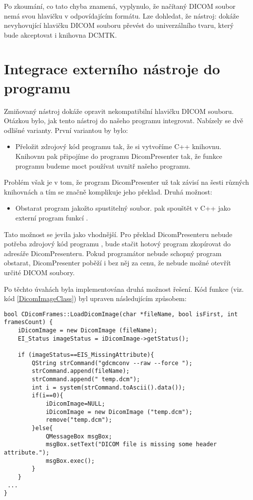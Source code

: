 
Po zkoumání, co tato chyba znamená, vyplynulo, že načítaný DICOM soubor nemá svou hlavičku v odpovídajícím formátu\cite{dcmtk}. Lze dohledat, že nástroj:  dokáže nevyhovující hlavičku DICOM souboru převést do univerzálního tvaru, který bude akceptovat i knihovna DCMTK.

\section{Integrace externího nástroje do programu}
Zmiňovaný nástroj  dokáže opravit nekompatibilní hlavičku DICOM souboru. Otázkou bylo, jak tento nástroj do našeho programu integrovat. Nabízely se dvě odlišné varianty. První variantou by bylo:

\begin{itemize}
\item
Přeložit zdrojový kód programu  tak, že si vytvoříme C++ knihovnu. Knihovnu pak připojíme do programu DicomPresenter tak, že funkce programu  budeme moct používat uvnitř našeho programu.
\end{itemize}

Problém však je v tom, že program DicomPresenter už tak závisí na šesti různých knihovnách a tím se značně komplikuje jeho překlad. Druhá možnost:

\begin{itemize}
\item
Obstarat program  jakožto spustitelný soubor.  pak spouštět v C++ jako externí program funkcí .
\end{itemize}

Tato možnost se jevila jako vhodnější. Pro překlad DicomPresenteru nebude potřeba zdrojový kód programu , bude stačit hotový program zkopírovat do adresáře DicomPresenteru. Pokud programátor nebude schopný program obstarat, DicomPresenter poběží i bez něj za cenu, že nebude možné otevřít určité DICOM soubory.

Po těchto úvahách byla implementována druhá možnost řešení. Kód funkce  (viz. kód \ref{DicomImageClass}) byl upraven následujícím způsobem:

\begin{lstlisting}[caption={Opravené načítání DICOM snímků. Pokusíme se o načtení snímku, pokud je hlavička DICOM souboru špatná, opravíme jí nástrojem \clist{gdcmconv}.}]
bool CDicomFrames::LoadDicomImage(char *fileName, bool isFirst, int framesCount) {
	iDicomImage = new DicomImage (fileName);
	EI_Status imageStatus = iDicomImage->getStatus();

	if (imageStatus==EIS_MissingAttribute){			
		QString strCommand("gdcmconv --raw --force ");
		strCommand.append(fileName);
		strCommand.append(" temp.dcm");
		int i = system(strCommand.toAscii().data());
		if(i==0){
			iDicomImage=NULL;
			iDicomImage = new DicomImage ("temp.dcm");
			remove("temp.dcm");
		}else{
			QMessageBox msgBox;
			msgBox.setText("DICOM file is missing some header attribute.");
			msgBox.exec();
		}		
	}
 ...
}
\end{lstlisting}

